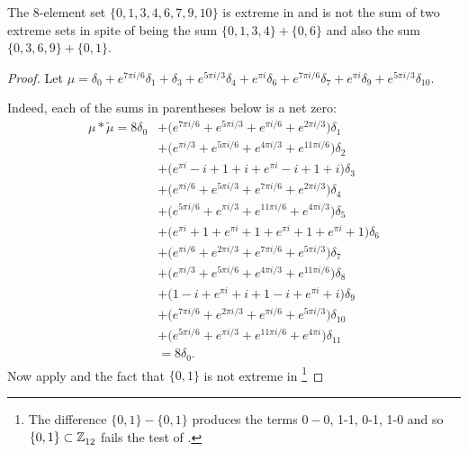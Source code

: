 \begin{prop}\label{prop8in12} The 8-element set
$\{0,1,3,4,6,7,9,10\}$ %
 is extreme in  and is not the sum of two extreme sets in spite of being the sum $ \{0,1,3,4\} +\{0,6\}$
 and also the sum $\{0,3,6,9\}+\{0,1\}$. 
\end{prop}
\begin{proof}Let $\mu =  \delta_{0}  +   e^{ 7\pi i  / 6}\delta_{1}  +  \delta_{3}  +   e^{ 5\pi i  / 3}\delta_{4}  +   e^{\pi i }\delta_{6}  +   e^{ 7\pi i  / 6}\delta_{7}  +   e^{\pi i }\delta_{9}  +   e^{ 5\pi i  / 3}\delta_{10}$.

Indeed, each of the sums in parentheses below is a net zero:
\begin{align*} \mu*\tilde \mu = 8\delta_{0} &   +  \big( e^{ 7 \pi i / 6}+ e^{ 5 \pi i / 3}+ e^{\pi i / 6}+ e^{ 2 \pi i / 3}\big)\delta_{1} 
\\&
 +  \big( e^{\pi i / 3}+ e^{ 5 \pi i / 6}
+ e^{ 4 \pi i / 3}+ e^{ 11 \pi i / 6}\big)\delta_{2} 
\\
&  +  \big( e^{\pi i }- i+ 1+  i + e^{\pi i }- i+ 1+  i \big)\delta_{3} 
\\
&  +  \big( e^{\pi i / 6}+ e^{ 5 \pi i / 3}+ e^{ 7 \pi i / 6}+ e^{ 2 \pi i / 3}\big)\delta_{4} 
\\&
  +  \big( e^{ 5 \pi i / 6}+ e^{\pi i / 3}+ e^{ 11 \pi i / 6}+ e^{ 4 \pi i / 3}\big)\delta_{5} 
\\
&  +  \big( e^{\pi i }+ 1+ e^{\pi i }+ 1+ e^{\pi i }+ 1+ e^{\pi i }+ 1\big)\delta_{6} 
\\&
  +  \big( e^{\pi i / 6}+ e^{ 2 \pi i / 3}+ e^{ 7 \pi i / 6}+ e^{ 5 \pi i / 3}\big)\delta_{7} 
\\
&  +  \big( e^{\pi i / 3}+ e^{ 5 \pi i / 6}+ e^{ 4 \pi i / 3}+ e^{ 11 \pi i / 6}\big)\delta_{8} 
\\
&  +  \big( 1- i+ e^{\pi i }+  i + 1- i+ e^{\pi i }+  i \big)\delta_{9} 
\\&
  +  \big( e^{ 7 \pi i / 6}+ e^{ 2 \pi i / 3}+ e^{\pi i / 6}+ e^{ 5 \pi i / 3}\big)\delta_{10} 
\\&
  +  \big( e^{ 5 \pi i / 6}+ e^{\pi i / 3}+ e^{ 11 \pi i / 6}+ e^{ 4 \pi i }\big)\delta_{11}
  \\& = 8\delta_0. 
\end{align*}
Now apply  and the fact that $\{0,1\}$ is not extreme in \footnote{The difference 
$\{0,1\}-\{0,1\}$ produces the terms $0-0$, 1-1, 0-1, 1-0 and so $\{0,1\} \subset \texttt{$\mathbb Z_{12}^{\,}$} $ fails the test of .}
\end{proof}



